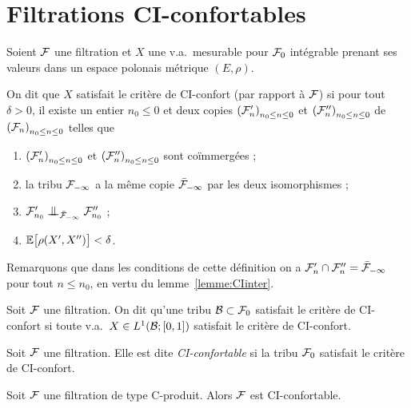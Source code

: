 \documentclass[12pt,a4paper]{article}
\begin{document}
\section{Filtrations CI-confortables}

\begin{definition}\label{def:CIconfort}
Soient $\mathcal{F}$ une filtration et $X$ une v.a.\ mesurable pour $\mathcal{F}_0$ 
intégrable prenant ses valeurs dans un espace polonais métrique $(E,\rho)$. 

On dit que $X$ satisfait le critère de CI-confort (par rapport à $\mathcal{F}$) si pour tout $\delta>0$, 
il existe un entier $n_0 \leq 0$ et deux copies  ${(\mathcal{F}'_n)}_{n_0 \leq n \leq 0}$ et 
${(\mathcal{F}''_n)}_{n_0 \leq n \leq 0}$ de 
${(\mathcal{F}_n)}_{n_0 \leq n \leq 0}$ telles que 
\begin{enumerate}
\item  ${(\mathcal{F}'_n)}_{n_0 \leq n \leq 0}$ et 
${(\mathcal{F}''_n)}_{n_0 \leq n \leq 0}$  sont co\"immergées ;

\item la tribu $\mathcal{F}_{-\infty}$ a la m\^eme copie $\bar{\mathcal{F}}_{-\infty}$ par les 
deux isomorphismes ;

\item $\FF'_{n_0} \indep_{\bar\FF_{-\infty}} \FF''_{n_0}$ ;

\item $\mathbb{E}\bigl[\rho(X', X'')\bigr] < \delta$.
\end{enumerate}
\end{definition}

Remarquons que dans les conditions de cette définition on 
a $\mathcal{F}'_{n}\cap\mathcal{F}''_{n} = \bar{\mathcal{F}}_{-\infty}$ pour tout $n \leq n_0$, en vertu du lemme~\ref{lemme:CIinter}.

\begin{definition}
Soit $\mathcal{F}$ une filtration. On dit qu'une tribu $\mathcal{B} \subset \mathcal{F}_0$ 
satisfait le critère de CI-confort si 
 toute v.a.\  $X \in L^1(\mathcal{B}; [0,1])$  satisfait le critère de CI-confort. 
\end{definition}

\begin{definition}
Soit $\mathcal{F}$ une filtration. Elle est dite \emph{CI-confortable} si 
la tribu $\mathcal{F}_0$  satisfait le critère de CI-confort. 
\end{definition}


\begin{ppsition}\label{ppsition:CproduitCIconfortable}
Soit $\mathcal{F}$ une filtration de type C-produit. Alors $\mathcal{F}$ est CI-confortable.
\end{ppsition}
\end{document}
